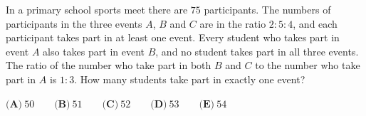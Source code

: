 In a primary school sports meet there are $75$ participants. The numbers of participants in the three events $A$, $B$ and $C$ are in the ratio $2:5:4$, and each participant takes part in at least one event. Every student who takes part in event $A$ also takes part in event $B$, and no student takes part in all three events. The ratio of the number who take part in both $B$ and $C$ to the number who take part in $A$ is $1:3$. How many students take part in exactly one event?

$\textbf{(A)}\ 50\qquad\textbf{(B)}\ 51\qquad\textbf{(C)}\ 52\qquad\textbf{(D)}\ 53\qquad\textbf{(E)}\ 54$
